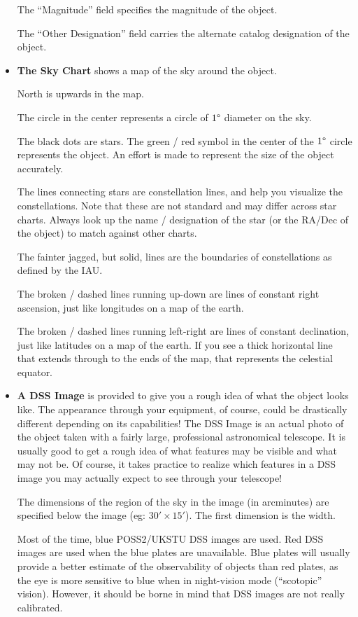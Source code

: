 \begin{itemize}
  The ``Magnitude'' field specifies the magnitude of the object.

  The ``Other Designation'' field carries the alternate catalog
  designation of the object.

\item \textbf{The Sky Chart} shows a map of the sky around the
  object.

  North is upwards in the map.
  
  The circle in the center represents a circle of $1\degree$ diameter
  on the sky.

  The black dots are stars. The green / red symbol in the center of
  the $1\degree$ circle represents the object. An effort is made to
  represent the size of the object accurately.

  The lines connecting stars are constellation lines, and help you
  visualize the constellations. Note that these are not standard and
  may differ across star charts. Always look up the name / designation
  of the star (or the RA/Dec of the object) to match against other
  charts.

  The fainter jagged, but solid, lines are the boundaries of
  constellations as defined by the IAU.

  The broken / dashed lines running up-down are lines of constant
  right ascension, just like longitudes on a map of the earth.

  The broken / dashed lines running left-right are lines of constant
  declination, just like latitudes on a map of the earth. If you see a
  thick horizontal line that extends through to the ends of the map,
  that represents the celestial equator.

\item \textbf{A DSS Image} is provided to give you a rough idea of
  what the object looks like. The appearance through your equipment,
  of course, could be drastically different depending on its
  capabilities! The DSS Image is an actual photo of the object taken
  with a fairly large, professional astronomical telescope. It is
  usually good to get a rough idea of what features may be visible and
  what may not be. Of course, it takes practice to realize which
  features in a DSS image you may actually expect to see through your
  telescope!

  The dimensions of the region of the sky in the image (in arcminutes)
  are specified below the image (eg: $30' \times 15'$). The first
  dimension is the width.

  Most of the time, blue POSS2/UKSTU DSS images are used. Red DSS
  images are used when the blue plates are unavailable. Blue plates
  will usually provide a better estimate of the observability of
  objects than red plates, as the eye is more sensitive to blue when
  in night-vision mode (``scotopic'' vision). However, it should be
  borne in mind that DSS images are not really calibrated.


\end{itemize}
